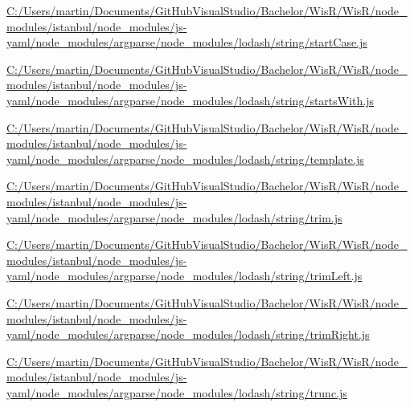 \begin{DoxyCompactItemize}
\item 
\hyperlink{_c_1_2_users_2martin_2_documents_2_git_hub_visual_studio_2_bachelor_2_wis_r_2_wis_r_2node_module7f77cc02039ba3294acefd9c038ac3a0}{C\+:/\+Users/martin/\+Documents/\+Git\+Hub\+Visual\+Studio/\+Bachelor/\+Wis\+R/\+Wis\+R/node\+\_\+modules/istanbul/node\+\_\+modules/js-\/yaml/node\+\_\+modules/argparse/node\+\_\+modules/lodash/string/start\+Case.\+js}
\item 
\hyperlink{_c_1_2_users_2martin_2_documents_2_git_hub_visual_studio_2_bachelor_2_wis_r_2_wis_r_2node_module4abf9e0f369dcd241493ffbcfee8830f}{C\+:/\+Users/martin/\+Documents/\+Git\+Hub\+Visual\+Studio/\+Bachelor/\+Wis\+R/\+Wis\+R/node\+\_\+modules/istanbul/node\+\_\+modules/js-\/yaml/node\+\_\+modules/argparse/node\+\_\+modules/lodash/string/starts\+With.\+js}
\item 
\hyperlink{_c_1_2_users_2martin_2_documents_2_git_hub_visual_studio_2_bachelor_2_wis_r_2_wis_r_2node_module3a8e07dc53882f57d4a430409610cbd9}{C\+:/\+Users/martin/\+Documents/\+Git\+Hub\+Visual\+Studio/\+Bachelor/\+Wis\+R/\+Wis\+R/node\+\_\+modules/istanbul/node\+\_\+modules/js-\/yaml/node\+\_\+modules/argparse/node\+\_\+modules/lodash/string/template.\+js}
\item 
\hyperlink{_c_1_2_users_2martin_2_documents_2_git_hub_visual_studio_2_bachelor_2_wis_r_2_wis_r_2node_moduleb121566d55e4aafe59056978181c8a8c}{C\+:/\+Users/martin/\+Documents/\+Git\+Hub\+Visual\+Studio/\+Bachelor/\+Wis\+R/\+Wis\+R/node\+\_\+modules/istanbul/node\+\_\+modules/js-\/yaml/node\+\_\+modules/argparse/node\+\_\+modules/lodash/string/trim.\+js}
\item 
\hyperlink{_c_1_2_users_2martin_2_documents_2_git_hub_visual_studio_2_bachelor_2_wis_r_2_wis_r_2node_modulef7a9d6696d60997b329b468af6a0c92e}{C\+:/\+Users/martin/\+Documents/\+Git\+Hub\+Visual\+Studio/\+Bachelor/\+Wis\+R/\+Wis\+R/node\+\_\+modules/istanbul/node\+\_\+modules/js-\/yaml/node\+\_\+modules/argparse/node\+\_\+modules/lodash/string/trim\+Left.\+js}
\item 
\hyperlink{_c_1_2_users_2martin_2_documents_2_git_hub_visual_studio_2_bachelor_2_wis_r_2_wis_r_2node_module0306d36b01b75f2794d83166ebde19f9}{C\+:/\+Users/martin/\+Documents/\+Git\+Hub\+Visual\+Studio/\+Bachelor/\+Wis\+R/\+Wis\+R/node\+\_\+modules/istanbul/node\+\_\+modules/js-\/yaml/node\+\_\+modules/argparse/node\+\_\+modules/lodash/string/trim\+Right.\+js}
\item 
\hyperlink{_c_1_2_users_2martin_2_documents_2_git_hub_visual_studio_2_bachelor_2_wis_r_2_wis_r_2node_modulecb2ec67dfe39550c38a3882e55dd1834}{C\+:/\+Users/martin/\+Documents/\+Git\+Hub\+Visual\+Studio/\+Bachelor/\+Wis\+R/\+Wis\+R/node\+\_\+modules/istanbul/node\+\_\+modules/js-\/yaml/node\+\_\+modules/argparse/node\+\_\+modules/lodash/string/trunc.\+js}

\end{DoxyCompactItemize}

